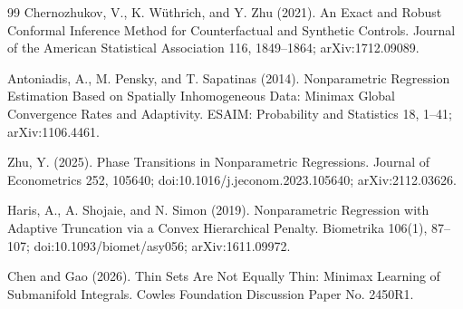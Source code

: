 \documentclass{article}
\begin{document}
\begin{thebibliography}{99}
   Chernozhukov, V., K. Wüthrich, and Y. Zhu (2021). An Exact and Robust Conformal Inference Method for Counterfactual and Synthetic Controls. Journal of the American Statistical Association 116, 1849--1864; arXiv:1712.09089.

   Antoniadis, A., M. Pensky, and T. Sapatinas (2014). Nonparametric Regression Estimation Based on Spatially Inhomogeneous Data: Minimax Global Convergence Rates and Adaptivity. ESAIM: Probability and Statistics 18, 1--41; arXiv:1106.4461.

   Zhu, Y. (2025). Phase Transitions in Nonparametric Regressions. Journal of Econometrics 252, 105640; doi:10.1016/j.jeconom.2023.105640; arXiv:2112.03626.

   Haris, A., A. Shojaie, and N. Simon (2019). Nonparametric Regression with Adaptive Truncation via a Convex Hierarchical Penalty. Biometrika 106(1), 87--107; doi:10.1093/biomet/asy056; arXiv:1611.09972.

   Chen and Gao (2026). Thin Sets Are Not Equally Thin: Minimax Learning of Submanifold Integrals. Cowles Foundation Discussion Paper No. 2450R1.

\end{thebibliography}
\end{document}
